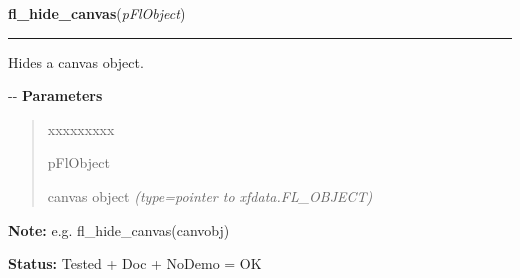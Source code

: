 \hspace{.8\funcindent}\begin{boxedminipage}{\funcwidth}

    \raggedright \textbf{fl\_hide\_canvas}(\textit{pFlObject})

    \vspace{-1.5ex}

    \rule{\textwidth}{0.5\fboxrule}
\setlength{\parskip}{2ex}

Hides a canvas object.

-{}-
\setlength{\parskip}{1ex}
      \textbf{Parameters}
      \vspace{-1ex}

      \begin{quote}
        \begin{Ventry}{xxxxxxxxx}

          \item[pFlObject]


canvas object
            {\it (type=pointer to xfdata.FL\_OBJECT)}

        \end{Ventry}

      \end{quote}

\textbf{Note:} 
e.g. fl\_hide\_canvas(canvobj)


\textbf{Status:} 
Tested + Doc + NoDemo = OK


    \end{boxedminipage}

    \label{xformslib:flcanvas:fl_share_canvas_colormap}

    \vspace{0.5ex}

